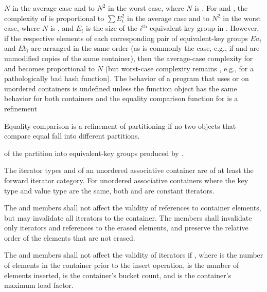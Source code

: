 $N$ in the average case and to $N^2$ in the worst case, where $N$ is
. For  and ,
the complexity of  is proportional to $\sum E_i^2$
in the average case and to $N^2$ in the worst case, where $N$ is ,
and $E_i$ is the size of the $i^\text{th}$ equivalent-key group in .
However, if the respective elements of each corresponding pair of
equivalent-key groups $Ea_i$ and $Eb_i$ are arranged in the same order
(as is commonly the case, e.g., if  and  are unmodified copies
of the same container), then the average-case complexity for
 and  becomes
proportional to $N$ (but worst-case complexity remains , e.g., for
a pathologically bad hash function). The behavior of a program that uses
 or  on unordered containers is undefined
unless the  function object has
the same behavior for both containers and the equality comparison function
for  is a refinement
\begin{footnote}
Equality comparison is a refinement
of partitioning if no two objects that
compare equal fall into different partitions.
\end{footnote}
of the partition into equivalent-key groups produced by .

\pnum
{}%
The iterator types  and  of
an unordered associative container are of at least the forward iterator
category.  For unordered associative containers where the key type and
value type are the same, both  and
 are constant iterators.

\pnum
{}%
The  and  members shall not affect the validity of references to
container elements, but may invalidate all iterators to the
container.  The  members shall invalidate only iterators and
references to the erased elements, and preserve the relative order of the
elements that are not erased.

\pnum
{}%
%
The  and  members shall not affect the validity of iterators if
, where  is the number of elements in
the container prior to the insert operation,  is the
number of elements inserted,  is the container's bucket count, and
 is the container's maximum load factor.

